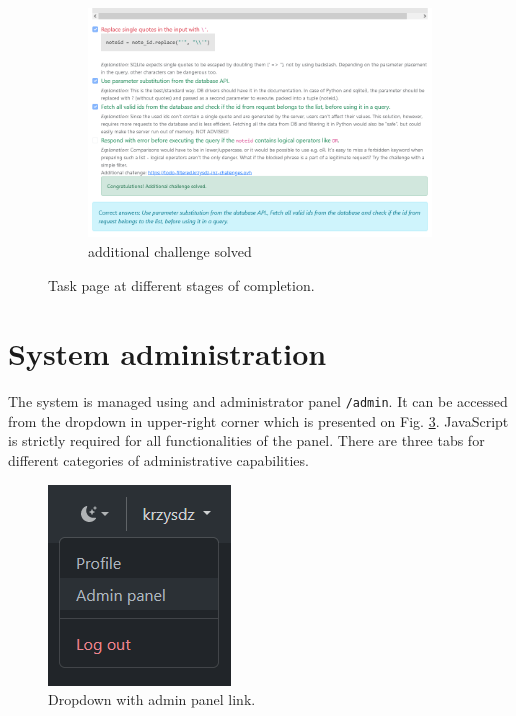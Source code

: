 \begin{figure}
    \begin{subfigure}{0.7\textwidth}
        \includegraphics[width=\textwidth]{img/manual-task-complete.png}
        \caption{additional challenge solved}
        \label{fig:manual-task-complete}
    \end{subfigure}
    \caption{Task page at different stages of completion.}
    \label{fig:manual-task}
\end{figure}

\section{System administration}
\label{chap:system-administration}

The system is managed using and administrator panel \texttt{/admin}. It can be accessed from the dropdown in upper-right corner which is presented on Fig. \ref{fig:manual-admin-dropdown}. JavaScript is strictly required for all functionalities of the panel. There are three tabs for different categories of administrative capabilities.

\begin{figure}
    \centering
    \includegraphics{img/manual-admin-dropdown.png}
    \caption{Dropdown with admin panel link.}
    \label{fig:manual-admin-dropdown}
\end{figure}

